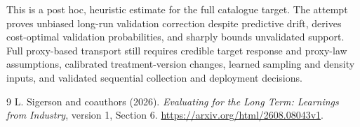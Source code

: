 \documentclass[11pt]{article}
\theoremstyle{remark}
\begin{document}
This is a post hoc, heuristic estimate for the full catalogue target.
The attempt proves unbiased long-run validation correction despite predictive drift, derives cost-optimal validation probabilities, and sharply bounds unvalidated support. Full proxy-based transport still requires credible target response and proxy-law assumptions, calibrated treatment-version changes, learned sampling and density inputs, and validated sequential collection and deployment decisions.

\begin{thebibliography}{9}
 L. Sigerson and coauthors (2026). \emph{Evaluating for the Long Term: Learnings from Industry}, version 1, Section 6. \url{https://arxiv.org/html/2608.08043v1}.
\end{thebibliography}
\end{document}
